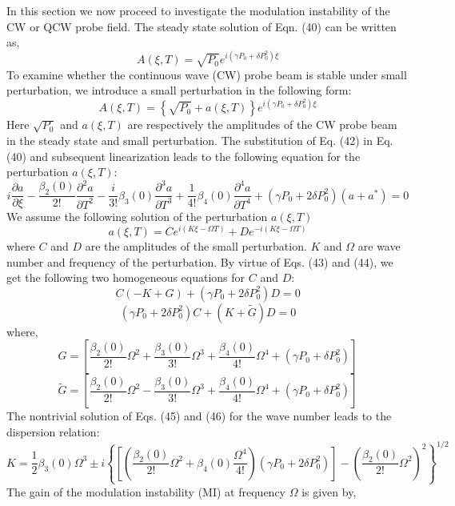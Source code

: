 \documentclass[a4paper,12pt]{article}
\begin{document}
In this section we now proceed to investigate the modulation instability of the CW or QCW probe field. The steady state solution of Eqn. (40) can be written as,
\begin{equation}
A(\xi, T) = \sqrt{P_0} e^{i (\gamma P_0 + \delta P_0^2) \xi}
\tag{41}
\end{equation}
To examine whether the continuous wave (CW) probe beam is stable under small perturbation, we introduce a small perturbation in the following form:
\begin{equation}
A(\xi, T) = \left\{ \sqrt{P_0} + a(\xi, T) \right\} e^{i (\gamma P_0 + \delta P_0^2) \xi}
\tag{42}
\end{equation}
Here \( \sqrt{P_0} \) and \( a(\xi, T) \) are respectively the amplitudes of the CW probe beam in the steady state and small perturbation. The substitution of Eq. (42) in Eq. (40) and subsequent linearization leads to the following equation for the perturbation \( a(\xi, T) \):
\begin{equation}
i \frac{\partial a}{\partial \xi} - \frac{\beta_2(0)}{2!} \frac{\partial^2 a}{\partial T^2} - \frac{i}{3!} \beta_3(0) \frac{\partial^3 a}{\partial T^3} + \frac{1}{4!} \beta_4(0) \frac{\partial^4 a}{\partial T^4} + (\gamma P_0 + 2 \delta P_0^2)(a + a^*) = 0
\tag{43}
\end{equation}
We assume the following solution of the perturbation \( a(\xi, T) \)
\begin{equation}
a(\xi, T) = C e^{i(K \xi - \Omega T)} + D e^{-i(K \xi - \Omega T)}
\tag{44}
\end{equation}
where \( C \) and \( D \) are the amplitudes of the small perturbation. \( K \) and \( \Omega \) are wave number and frequency of the perturbation. By virtue of Eqs. (43) and (44), we get the following two homogeneous equations for \( C \) and \( D \):
\begin{equation}
C(-K + G) + (\gamma P_0 + 2 \delta P_0^2) D = 0
\tag{45}
\end{equation}
\begin{equation}
(\gamma P_0 + 2 \delta P_0^2) C + (K + \tilde{G}) D = 0
\tag{46}
\end{equation}
where,
\[
G = \left[ \frac{\beta_2(0)}{2!} \Omega^2 + \frac{\beta_3(0)}{3!} \Omega^3 + \frac{\beta_4(0)}{4!} \Omega^4 + (\gamma P_0 + \delta P_0^2) \right]
\]
\[
\tilde{G} = \left[ \frac{\beta_2(0)}{2!} \Omega^2 - \frac{\beta_3(0)}{3!} \Omega^3 + \frac{\beta_4(0)}{4!} \Omega^4 + (\gamma P_0 + \delta P_0^2) \right]
\]
The nontrivial solution of Eqs. (45) and (46) for the wave number leads to the dispersion relation:
\begin{equation}
K = \frac{1}{2} \beta_3(0) \Omega^3 \pm i \left\{ \left[ \left( \frac{\beta_2(0)}{2!} \Omega^2 + \beta_4(0) \frac{\Omega^4}{4!} \right) \left( \gamma P_0 + 2 \delta P_0^2 \right) \right] - \left( \frac{\beta_2(0)}{2!} \Omega^2 \right)^2 \right\}^{1/2}
\tag{47}
\end{equation}
The gain of the modulation instability (MI) at frequency \( \Omega \) is given by,
\end{document}
